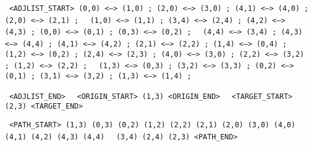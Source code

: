 \colorbox[RGB]{ 217,210,233 }{ \texttt{ <ADJLIST\_START> (0,0) <--> (1,0) ; (2,0) <--> (3,0) ; (4,1) <--> (4,0) ; (2,0) <--> (2,1) ; }} 
\colorbox[RGB]{ 217,210,233 }{ \texttt{ (1,0) <--> (1,1) ; (3,4) <--> (2,4) ; (4,2) <--> (4,3) ; (0,0) <--> (0,1) ; (0,3) <--> (0,2) ; }}
\colorbox[RGB]{ 217,210,233 }{ \texttt{ (4,4) <--> (3,4) ; (4,3) <--> (4,4) ; (4,1) <--> (4,2) ; (2,1) <--> (2,2) ; (1,4) <--> (0,4) ; }}
\colorbox[RGB]{ 217,210,233 }{ \texttt{ (1,2) <--> (0,2) ; (2,4) <--> (2,3) ; (4,0) <--> (3,0) ; (2,2) <--> (3,2) ; (1,2) <--> (2,2) ; }} 
\colorbox[RGB]{ 217,210,233 }{ \texttt{ (1,3) <--> (0,3) ; (3,2) <--> (3,3) ; (0,2) <--> (0,1) ; (3,1) <--> (3,2) ; (1,3) <--> (1,4) ; }}

\colorbox[RGB]{ 217,210,233 }{ \texttt{ <ADJLIST\_END> } } \colorbox[RGB]{ 217,234,211 }{ \texttt{ <ORIGIN\_START> (1,3) <ORIGIN\_END> } } \colorbox[RGB]{ 234,209,220 }{ \texttt{ <TARGET\_START> (2,3) <TARGET\_END> } } 

\colorbox[RGB]{ 207,226,243 }{ \texttt{ <PATH\_START> (1,3) (0,3) (0,2) (1,2) (2,2) (2,1) (2,0) (3,0) (4,0) (4,1) (4,2) (4,3) (4,4) }}
\colorbox[RGB]{ 207,226,243 }{ \texttt{ (3,4) (2,4) (2,3) <PATH\_END> } } \\